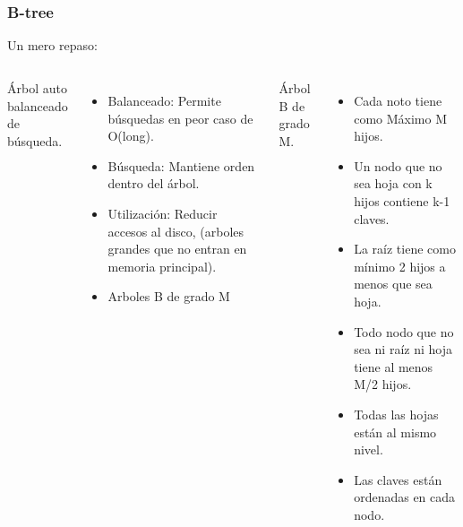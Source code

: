 \documentclass[10pt,handout]{beamer}
\begin{document}
\section{}
\begin{frame}[noframenumbering]
\frametitle{B-tree}
Un mero repaso:

\begin{columns}
    Árbol auto balanceado de búsqueda.
    \begin{itemize}
\pause
       \item Balanceado: Permite búsquedas en peor caso de O(long).
       \item Búsqueda: Mantiene orden dentro del árbol.
\pause
       \item Utilización: Reducir accesos al disco, (arboles grandes que no entran en memoria principal).
       \item Arboles B de grado M
    \end{itemize}

    Árbol B de grado M.
        \begin{itemize}
\pause
          \item Cada noto tiene como Máximo M hijos.
          \item Un nodo que no sea hoja con k hijos contiene k-1 claves.
          \item La raíz tiene como mínimo 2 hijos a menos que sea hoja.
\pause
          \item Todo nodo que no sea ni raíz ni hoja tiene al menos M/2 hijos.
          \item Todas las hojas están al mismo nivel.
          \item Las claves están ordenadas en cada nodo.
        \end{itemize}
\end{columns}
\end{frame}
\end{document}
